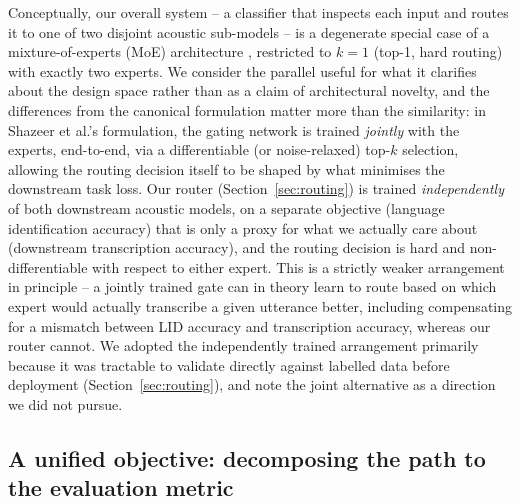 \documentclass[11pt]{article}
\begin{document}
Conceptually, our overall system -- a classifier that inspects each input and routes it to one of two disjoint acoustic sub-models -- is a degenerate special case of a mixture-of-experts (MoE) architecture \cite{shazeer2017moe}, restricted to $k=1$ (top-1, hard routing) with exactly two experts. We consider the parallel useful for what it clarifies about the design space rather than as a claim of architectural novelty, and the differences from the canonical formulation matter more than the similarity: in Shazeer et al.'s formulation, the gating network is trained \emph{jointly} with the experts, end-to-end, via a differentiable (or noise-relaxed) top-$k$ selection, allowing the routing decision itself to be shaped by what minimises the downstream task loss. Our router (Section~\ref{sec:routing}) is trained \emph{independently} of both downstream acoustic models, on a separate objective (language identification accuracy) that is only a proxy for what we actually care about (downstream transcription accuracy), and the routing decision is hard and non-differentiable with respect to either expert. This is a strictly weaker arrangement in principle -- a jointly trained gate can in theory learn to route based on which expert would actually transcribe a given utterance better, including compensating for a mismatch between LID accuracy and transcription accuracy, whereas our router cannot. We adopted the independently trained arrangement primarily because it was tractable to validate directly against labelled data before deployment (Section~\ref{sec:routing}), and note the joint alternative as a direction we did not pursue.

\subsection{A unified objective: decomposing the path to the evaluation metric}
\end{document}
